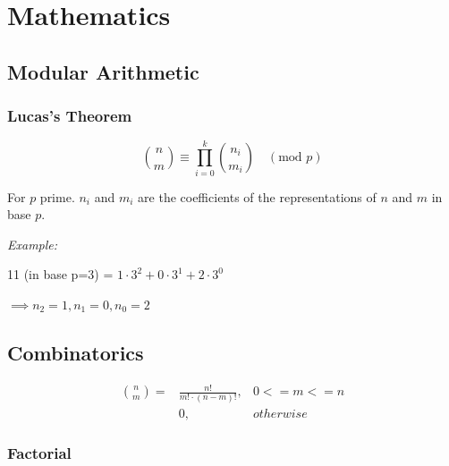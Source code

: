 \chapter{Mathematics}

\section{Modular Arithmetic}


	\subsection{Lucas's Theorem}

	$$ \binom{n}{m} \equiv \prod_{i=0}^k \binom{n_i}{m_i} \quad (\text{mod } p) $$ 

	For $p$ prime. $n_i$ and $m_i$ are the coefficients of the representations of $n$ and $m$ in base $p$.

	\textit{Example:}

		11 (in base p=3) = $1 \cdot 3^2 + 0 \cdot 3^1 + 2 \cdot 3^0$

		$\implies n_2 = 1, n_1 = 0, n_0 = 2$

\section{Combinatorics}

	\begin{align*}
		\binom{n}{m} =  & \frac{ n! }{ m! \cdot (n-m)! }, & 0 <= m <= n \\
						& 0, & otherwise
	\end{align*}

	\subsection{Factorial}

